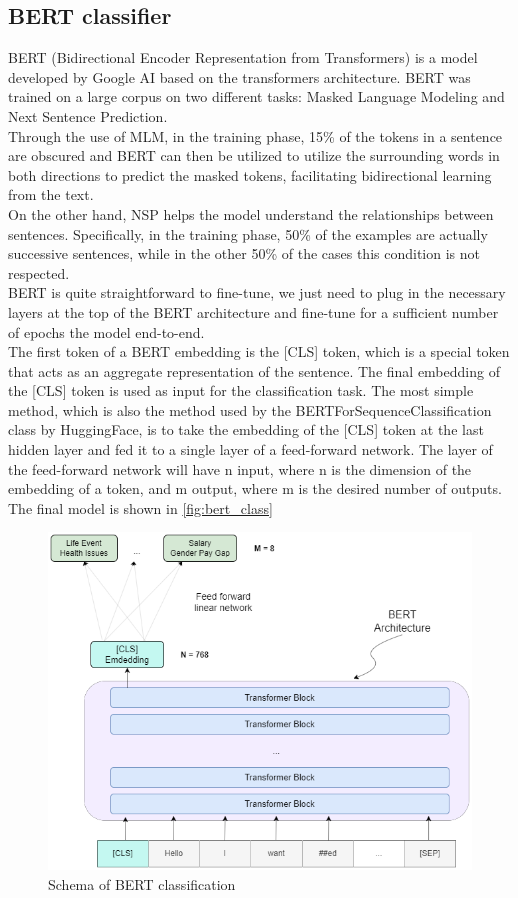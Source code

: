 \subsection{BERT classifier}
BERT (Bidirectional Encoder Representation from Transformers) is a model developed by Google AI based on the transformers architecture. BERT was trained on a large corpus on two different tasks: Masked Language Modeling and Next Sentence Prediction. \\
Through the use of MLM, in the training phase, 15\% of the tokens in a sentence are obscured and BERT can then be utilized to utilize the surrounding words in both directions to predict the masked tokens, facilitating bidirectional learning from the text. \\
On the other hand, NSP helps the model understand the relationships between sentences. Specifically, in the training phase, 50\% of the examples are actually successive sentences, while in the other 50\% of the cases this condition is not respected. \\
BERT is quite straightforward to fine-tune, we just need to plug in the necessary layers at the top of the BERT architecture and fine-tune for a sufficient number of epochs the model end-to-end. \\
The first token of a BERT embedding is the [CLS] token, which is a special token that acts as an aggregate representation of the sentence. The final embedding of the [CLS] token is used as input for the classification task. The most simple method, which is also the method used by the BERTForSequenceClassification class by HuggingFace, is to take the embedding of the [CLS] token at the last hidden layer and fed it to a single layer of a feed-forward network. The layer of the feed-forward network will have n input, where n is the dimension of the embedding of a token, and m output, where m is the desired number of outputs. \\
The final model is shown in \autoref{fig:bert_class}
\begin{figure}[h] 
  \includegraphics[width=\textwidth]{images/bert_class.drawio.png}
  \caption{Schema of BERT classification}
  \label{fig:bert_class}
\end{figure}

